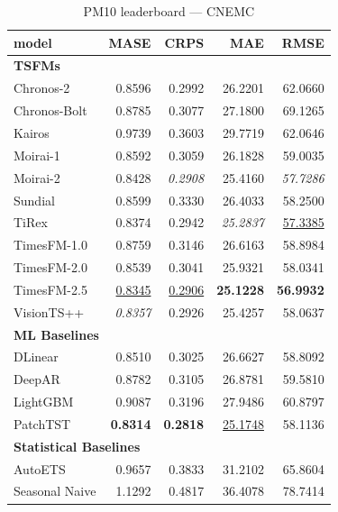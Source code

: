 \begin{table}[H]
\caption{PM10 leaderboard --- CNEMC}
\centering
\begin{small}
\begin{tabular}{lrrrr}
\toprule
model & MASE & CRPS & MAE & RMSE \\
\midrule
\multicolumn{5}{l}{\textbf{TSFMs}} \\
Chronos-2 & 0.8596 & 0.2992 & 26.2201 & 62.0660 \\
Chronos-Bolt & 0.8785 & 0.3077 & 27.1800 & 69.1265 \\
Kairos & 0.9739 & 0.3603 & 29.7719 & 62.0646 \\
Moirai-1 & 0.8592 & 0.3059 & 26.1828 & 59.0035 \\
Moirai-2 & 0.8428 & \textit{0.2908} & 25.4160 & \textit{57.7286} \\
Sundial & 0.8599 & 0.3330 & 26.4033 & 58.2500 \\
TiRex & 0.8374 & 0.2942 & \textit{25.2837} & \underline{57.3385} \\
TimesFM-1.0 & 0.8759 & 0.3146 & 26.6163 & 58.8984 \\
TimesFM-2.0 & 0.8539 & 0.3041 & 25.9321 & 58.0341 \\
TimesFM-2.5 & \underline{0.8345} & \underline{0.2906} & \textbf{25.1228} & \textbf{56.9932} \\
VisionTS++ & \textit{0.8357} & 0.2926 & 25.4257 & 58.0637 \\
\midrule
\multicolumn{5}{l}{\textbf{ML Baselines}} \\
DLinear & 0.8510 & 0.3025 & 26.6627 & 58.8092 \\
DeepAR & 0.8782 & 0.3105 & 26.8781 & 59.5810 \\
LightGBM & 0.9087 & 0.3196 & 27.9486 & 60.8797 \\
PatchTST & \textbf{0.8314} & \textbf{0.2818} & \underline{25.1748} & 58.1136 \\
\midrule
\multicolumn{5}{l}{\textbf{Statistical Baselines}} \\
AutoETS & 0.9657 & 0.3833 & 31.2102 & 65.8604 \\
Seasonal Naive & 1.1292 & 0.4817 & 36.4078 & 78.7414 \\
\bottomrule
\end{tabular}
\end{small}
\end{table}